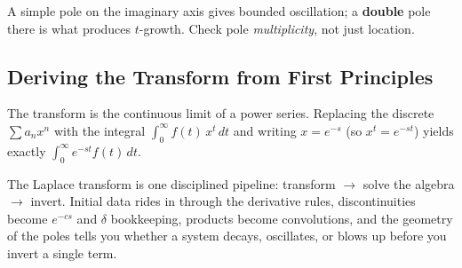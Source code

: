 \begin{warningbox}
A simple pole on the imaginary axis gives bounded oscillation; a \textbf{double} pole
there is what produces $t$-growth. Check pole \emph{multiplicity}, not just location.
\end{warningbox}

\subsection{Deriving the Transform from First Principles}

The transform is the continuous limit of a power series. Replacing the discrete
$\sum a_n x^n$ with the integral $\int_0^\infty f(t)\,x^t\,dt$ and writing $x=e^{-s}$
(so $x^t=e^{-st}$) yields exactly $\int_0^\infty e^{-st}f(t)\,dt$.

\begin{conceptbox}
The Laplace transform is one disciplined pipeline:
\textcolor{accentorange}{transform $\to$ solve the algebra $\to$ invert}. Initial data
rides in through the derivative rules, discontinuities become $e^{-cs}$ and $\delta$
bookkeeping, products become convolutions, and the
\textcolor{accentorange}{geometry of the poles} tells you whether a system decays,
oscillates, or blows up before you invert a single term.
\end{conceptbox}


